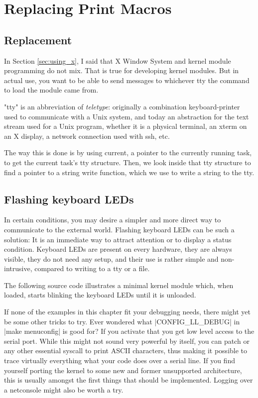 \documentclass[10pt, oneside]{book}
\begin{document}

\section{Replacing Print Macros}
\label{sec:print_macros}
\subsection{Replacement}
In Section \ref{sec:using_x}, I said that X Window System and kernel module programming do not mix.
That is true for developing kernel modules.
But in actual use, you want to be able to send messages to whichever tty the command to load the module came from.

"tty" is an abbreviation of \emph{teletype}: originally a combination keyboard-printer used to communicate with a Unix system, and today an abstraction for the text stream used for a Unix program, whether it is a physical terminal, an xterm on an X display, a network connection used with ssh, etc.

The way this is done is by using current, a pointer to the currently running task, to get the current task's tty structure.
Then, we look inside that tty structure to find a pointer to a string write function, which we use to write a string to the tty.


\subsection{Flashing keyboard LEDs}
\label{sec:flash_kb_led}
In certain conditions, you may desire a simpler and more direct way to communicate to the external world.
Flashing keyboard LEDs can be such a solution: It is an immediate way to attract attention or to display a status condition.
Keyboard LEDs are present on every hardware, they are always visible, they do not need any setup, and their use is rather simple and non-intrusive, compared to writing to a tty or a file.

The following source code illustrates a minimal kernel module which, when loaded, starts blinking the keyboard LEDs until it is unloaded.


If none of the examples in this chapter fit your debugging needs, there might yet be some other tricks to try.
Ever wondered what \cpp|CONFIG_LL_DEBUG| in \sh|make menuconfig| is good for?
If you activate that you get low level access to the serial port.
While this might not sound very powerful by itself, you can patch  or any other essential syscall to print ASCII characters, thus making it possible to trace virtually everything what your code does over a serial line.
If you find yourself porting the kernel to some new and former unsupported architecture, this is usually amongst the first things that should be implemented.
Logging over a netconsole might also be worth a try.
\end{document}
